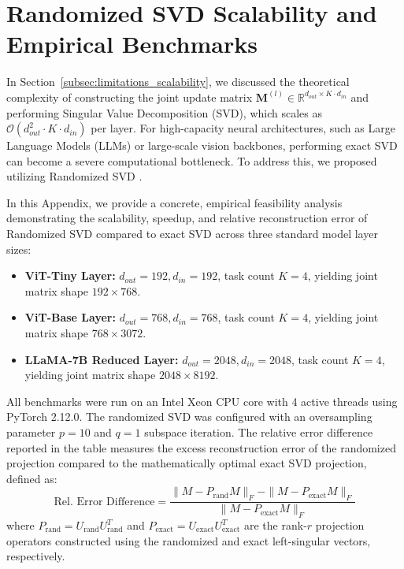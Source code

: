 \documentclass{article}
\theoremstyle{plain}
\theoremstyle{definition}
\theoremstyle{remark}
\begin{document}










\newpage
\appendix
\onecolumn
\section{Randomized SVD Scalability and Empirical Benchmarks}
\label{appendix:svd_randomized}

In Section~\ref{subsec:limitations_scalability}, we discussed the theoretical complexity of constructing the joint update matrix $\mathbf{M}^{(l)} \in \mathbb{R}^{d_{out} \times K \cdot d_{in}}$ and performing Singular Value Decomposition (SVD), which scales as $\mathcal{O}(d_{out}^2 \cdot K \cdot d_{in})$ per layer. For high-capacity neural architectures, such as Large Language Models (LLMs) or large-scale vision backbones, performing exact SVD can become a severe computational bottleneck. To address this, we proposed utilizing Randomized SVD \cite{halko2011finding}.

In this Appendix, we provide a concrete, empirical feasibility analysis demonstrating the scalability, speedup, and relative reconstruction error of Randomized SVD compared to exact SVD across three standard model layer sizes:
\begin{itemize}
    \item \textbf{ViT-Tiny Layer:} $d_{out} = 192, d_{in} = 192$, task count $K = 4$, yielding joint matrix shape $192 \times 768$.
    \item \textbf{ViT-Base Layer:} $d_{out} = 768, d_{in} = 768$, task count $K = 4$, yielding joint matrix shape $768 \times 3072$.
    \item \textbf{LLaMA-7B Reduced Layer:} $d_{out} = 2048, d_{in} = 2048$, task count $K = 4$, yielding joint matrix shape $2048 \times 8192$.
\end{itemize}

All benchmarks were run on an Intel Xeon CPU core with 4 active threads using PyTorch 2.12.0. The randomized SVD was configured with an oversampling parameter $p = 10$ and $q = 1$ subspace iteration. The relative error difference reported in the table measures the excess reconstruction error of the randomized projection compared to the mathematically optimal exact SVD projection, defined as:
\begin{equation}
    \text{Rel. Error Difference} = \frac{\|M - P_{\text{rand}} M\|_F - \|M - P_{\text{exact}} M\|_F}{\|M - P_{\text{exact}} M\|_F}
\end{equation}
where $P_{\text{rand}} = U_{\text{rand}} U_{\text{rand}}^T$ and $P_{\text{exact}} = U_{\text{exact}} U_{\text{exact}}^T$ are the rank-$r$ projection operators constructed using the randomized and exact left-singular vectors, respectively.
\end{document}
